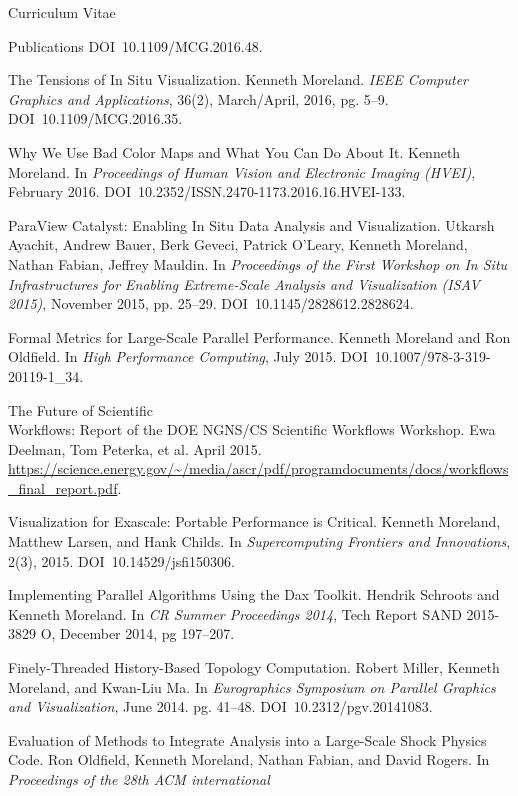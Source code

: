 \documentclass{article}
\begin{document}
\begin{cv}{Curriculum Vitae}
\begin{cvlist}{Publications}
      DOI~10.1109/MCG.2016.48.
    \item[The Tensions of In Situ Visualization.]
      Kenneth Moreland.
      \emph{IEEE Computer Graphics and Applications}, 36(2), March/April, 2016, pg. 5--9.
      DOI~10.1109/MCG.2016.35.
    \item[Why We Use Bad Color Maps and What You Can Do About It.]
      Kenneth Moreland.
      In \emph{Proceedings of Human Vision and Electronic Imaging (HVEI)}, February 2016.
      DOI~10.2352/ISSN.2470-1173.2016.16.HVEI-133.
    \item[ParaView Catalyst: Enabling In Situ Data Analysis and Visualization.]
      Utkarsh Ayachit, Andrew Bauer, Berk Geveci, Patrick O'Leary, Kenneth Moreland, Nathan Fabian, Jeffrey Mauldin.
      In \emph{Proceedings of the First Workshop on In Situ Infrastructures for Enabling Extreme-Scale Analysis and Visualization (ISAV 2015)}, November 2015, pp. 25--29.
      DOI~10.1145/2828612.2828624.
    \item[Formal Metrics for Large-Scale Parallel Performance.]
      Kenneth Moreland and Ron Oldfield.
      In \emph{High Performance Computing}, July 2015.
      DOI~10.1007/978-3-319-20119-1\_34.
    \item[The Future of Scientific]~\\ Workflows: Report of the DOE NGNS/CS Scientific Workflows Workshop.
      Ewa Deelman, Tom Peterka, et al.
      April 2015.
      \url{https://science.energy.gov/~/media/ascr/pdf/programdocuments/docs/workflows_final_report.pdf}.
    \item[Visualization for Exascale: Portable Performance is Critical.]
      Kenneth Moreland, Matthew Larsen, and Hank Childs.
      In \emph{Supercomputing Frontiers and Innovations}, 2(3), 2015.
      DOI~10.14529/jsfi150306.
    \item[Implementing Parallel Algorithms Using the Dax Toolkit.]
      Hendrik Schroots and Kenneth Moreland.
      In \emph{CR Summer Proceedings 2014}, Tech Report SAND 2015-3829 O, December 2014, pg 197--207.
    \item[Finely-Threaded History-Based Topology Computation.] Robert
      Miller, Kenneth Moreland, and Kwan-Liu Ma. In \emph{Eurographics
        Symposium on Parallel Graphics and Visualization}, June 2014. pg.
      41--48. DOI~10.2312/pgv.20141083.
    \item[Evaluation of Methods to Integrate Analysis into a Large-Scale
      Shock] Physics Code. Ron Oldfield, Kenneth Moreland, Nathan Fabian,
      and David Rogers. In \emph{Proceedings of the 28th ACM international
}
\end{cvlist}
\end{cv}
\end{document}
